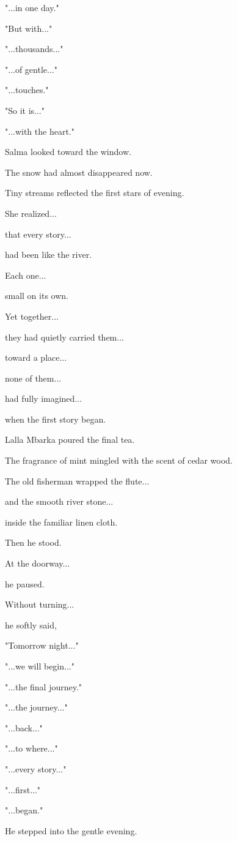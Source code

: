 \documentclass[12pt,openany]{book}
\begin{document}
"...in one day."

"But with..."

"...thousands..."

"...of gentle..."

"...touches."

"So it is..."

"...with the heart."

Salma looked toward the window.

The snow had almost disappeared now.

Tiny streams reflected the first stars of evening.

She realized...

that every story...

had been like the river.

Each one...

small on its own.

Yet together...

they had quietly carried them...

toward a place...

none of them...

had fully imagined...

when the first story began.

Lalla Mbarka poured the final tea.

The fragrance of mint mingled with the scent of cedar wood.

The old fisherman wrapped the flute...

and the smooth river stone...

inside the familiar linen cloth.

Then he stood.

At the doorway...

he paused.

Without turning...

he softly said,

"Tomorrow night..."

"...we will begin..."

"...the final journey."

"...the journey..."

"...back..."

"...to where..."

"...every story..."

"...first..."

"...began."

He stepped into the gentle evening.
\end{document}
